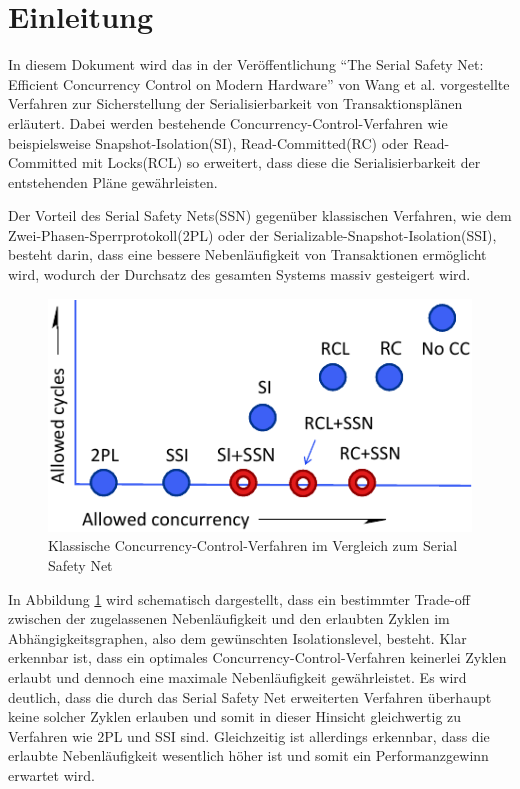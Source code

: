 \section{Einleitung}

In diesem Dokument wird das in der Veröffentlichung \enquote{The Serial Safety Net: Efficient Concurrency Control on Modern Hardware} von Wang et al. \cite{Wang:2015} vorgestellte Verfahren zur Sicherstellung der Serialisierbarkeit von Transaktionsplänen erläutert.
Dabei werden bestehende Concurrency-Control-Verfahren wie beispielsweise Snapshot-Isolation(SI), Read-Committed(RC) oder Read-Committed mit Locks(RCL) so erweitert, dass diese die Serialisierbarkeit der entstehenden Pläne gewährleisten.

Der Vorteil des Serial Safety Nets(SSN) gegenüber klassischen Verfahren, wie dem Zwei-Phasen-Sperrprotokoll(2PL) oder der Serializable-Snapshot-Isolation(SSI), besteht darin, dass eine bessere Nebenläufigkeit von Transaktionen ermöglicht wird, wodurch der Durchsatz des gesamten Systems massiv gesteigert wird.

\begin{figure}
	\includegraphics{img/Figure_1_komplett.pdf}
	\caption{Klassische Concurrency-Control-Verfahren im Vergleich zum Serial Safety Net}
	\label{fig:trade_off}
\end{figure}

In Abbildung \ref{fig:trade_off} wird schematisch dargestellt, dass ein bestimmter Trade-off zwischen der zugelassenen Nebenläufigkeit und den erlaubten Zyklen im Abhängigkeitsgraphen, also dem gewünschten Isolationslevel, besteht.
Klar erkennbar ist, dass ein optimales Concurrency-Control-Verfahren keinerlei Zyklen erlaubt und dennoch eine maximale Nebenläufigkeit gewährleistet.
Es wird deutlich, dass die durch das Serial Safety Net erweiterten Verfahren überhaupt keine solcher Zyklen erlauben und somit in dieser Hinsicht gleichwertig zu Verfahren wie 2PL und SSI sind.
Gleichzeitig ist allerdings erkennbar, dass die erlaubte Nebenläufigkeit wesentlich höher ist und somit ein Performanzgewinn erwartet wird.

